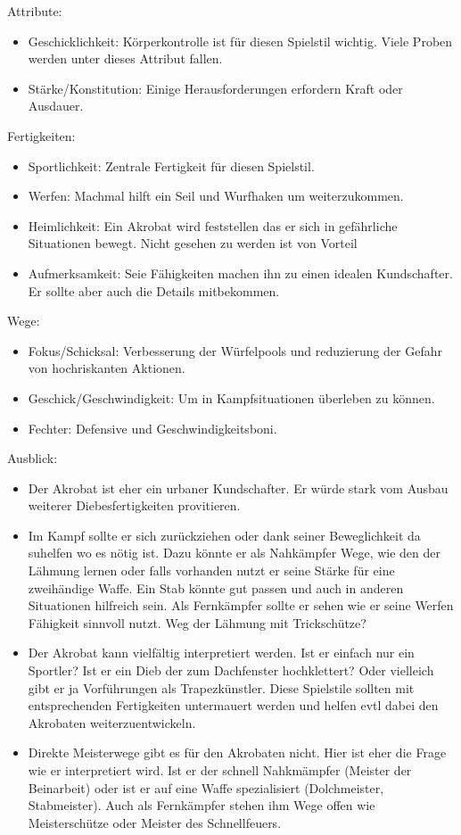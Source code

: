 \documentclass{article}
\begin{document}
Attribute:
\begin{itemize}
\item Geschicklichkeit: Körperkontrolle ist für diesen Spielstil wichtig. Viele Proben werden unter dieses Attribut fallen.
\item Stärke/Konstitution: Einige Herausforderungen erfordern Kraft oder Ausdauer.
\end{itemize}

Fertigkeiten:
\begin{itemize}
\item Sportlichkeit: Zentrale Fertigkeit für diesen Spielstil.
\item Werfen: Machmal hilft ein Seil und Wurfhaken um weiterzukommen.
\item Heimlichkeit: Ein Akrobat wird feststellen das er sich in gefährliche Situationen bewegt. Nicht gesehen zu werden ist von Vorteil
\item Aufmerksamkeit: Seie Fähigkeiten machen ihn zu einen idealen Kundschafter. Er sollte aber auch die Details mitbekommen.
\end{itemize}

Wege:
\begin{itemize}
\item Fokus/Schicksal: Verbesserung der Würfelpools und reduzierung der Gefahr von hochriskanten Aktionen.
\item Geschick/Geschwindigkeit: Um in Kampfsituationen überleben zu können.
\item Fechter: Defensive und Geschwindigkeitsboni.
\end{itemize}

Ausblick:
\begin{itemize}
\item Der Akrobat ist eher ein urbaner Kundschafter. Er würde stark vom Ausbau weiterer Diebesfertigkeiten provitieren.
\item Im Kampf sollte er sich zurückziehen oder dank seiner Beweglichkeit da suhelfen wo es nötig ist. Dazu könnte er als Nahkämpfer Wege, wie den der Lähmung lernen oder falls vorhanden nutzt er seine Stärke für eine zweihändige Waffe. Ein Stab könnte gut passen und auch in anderen Situationen hilfreich sein. Als Fernkämpfer sollte er sehen wie er seine Werfen Fähigkeit sinnvoll nutzt. Weg der Lähmung mit Trickschütze?
\item Der Akrobat kann vielfältig interpretiert werden. Ist er einfach nur ein Sportler? Ist er ein Dieb der zum Dachfenster hochklettert? Oder vielleich gibt er ja Vorführungen als Trapezkünstler. Diese Spielstile sollten mit entsprechenden Fertigkeiten untermauert werden und helfen evtl dabei den Akrobaten weiterzuentwickeln.
\item Direkte Meisterwege gibt es für den Akrobaten nicht. Hier ist eher die Frage wie er interpretiert wird. Ist er der schnell Nahkmämpfer (Meister der Beinarbeit) oder ist er auf eine Waffe spezialisiert (Dolchmeister, Stabmeister). Auch als Fernkämpfer stehen ihm Wege offen wie Meisterschütze oder Meister des Schnellfeuers.
\end{itemize}
\end{document}
